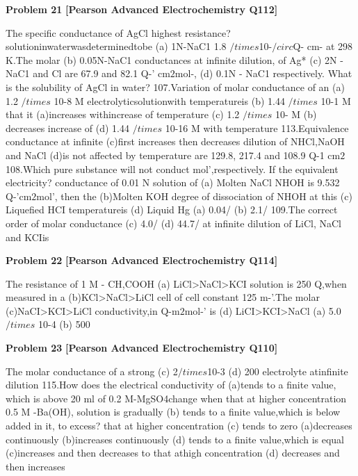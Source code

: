 \begin{problembox}
\textbf{Problem 21} \hfill \textbf{[Pearson Advanced Electrochemistry Q112]}
\label{q:ext-pearson-21}

The specific conductance of AgCl
highest resistance?
solutioninwaterwasdeterminedtobe
(a) 1N-NaC1
1.8 $/times$10-$/circ$Q- cm- at 298 K.The molar
(b) 0.05N-NaC1
conductances at infinite dilution, of Ag*
(c) 2N -NaC1
and Cl are 67.9 and 82.1 Q-' cm$2$mol-,
(d) 0.1N - NaC1
respectively. What is the solubility of
AgCl in water?
107.Variation of molar conductance of an
(a) 1.2 $/times$ 10-8 M
electrolyticsolutionwith temperatureis
(b) 1.44 $/times$ 10-1 M
that it
(a)increases withincrease of temperature
(c) 1.2 $/times$ 10- M
(b) decreases
increase
of
(d) 1.44 $/times$ 10-16 M
with
temperature
113.Equivalence conductance at infinite
(c)first increases then decreases
dilution of NHCl,NaOH and NaCl
(d)is not affected by temperature
are 129.8, 217.4 and 108.9 Q-1 cm$2$
108.Which pure substance will not conduct
mol',respectively. If the equivalent
electricity?
conductance of 0.01 N solution of
(a) Molten NaCl
NHOH is 9.532 Q-'cm$2$mol', then the
(b)Molten KOH
degree of dissociation of NHOH at this
(c) Liquefied HCI
temperatureis
(d) Liquid Hg
(a) 0.04/%
(b) 2.1/%
109.The correct order of molar conductance
(c) 4.0/%
(d) 44.7/%
at infinite dilution of LiCl, NaCl and
KCIis
\end{problembox}

\begin{problembox}
\textbf{Problem 22} \hfill \textbf{[Pearson Advanced Electrochemistry Q114]}
\label{q:ext-pearson-22}

The resistance of 1 M - CH,COOH
(a) LiCl>NaCl>KCI
solution is 250 Q,when measured in a
(b)KCl>NaCl>LiCl
cell of cell constant 125 m-'.The molar
(c)NaCI>KCI>LiCl
conductivity,in Q-m$2$mol-' is
(d) LiCI>KCI>NaCl
(a) 5.0 $/times$ 10-4
(b) 500
\end{problembox}

\begin{problembox}
\textbf{Problem 23} \hfill \textbf{[Pearson Advanced Electrochemistry Q110]}
\label{q:ext-pearson-23}

The molar conductance of a strong
(c) 2$/times$10-3
(d) 200
electrolyte atinfinite dilution
115.How does the electrical conductivity of
(a)tends to a finite value, which is above
20 ml of 0.2 M-MgSO4change when
that at higher concentration
0.5 M -Ba(OH), solution is gradually
(b) tends to a finite value,which is below
added in it, to excess?
that at higher concentration
(c) tends to zero
(a)decreases continuously
(b)increases continuously
(d) tends to a finite value,which is equal
(c)increases and then decreases
to that athigh concentration
(d) decreases and then increases
\end{problembox}

